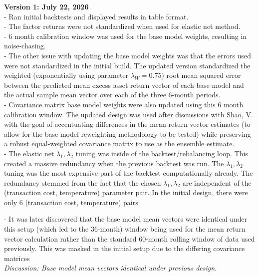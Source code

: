 \documentclass{article}
\begin{document}
\vspace{5mm}

\textbf{Version 1: July 22, 2026}\\

- Ran initial backtests and displayed results in table format.\\

- The factor returns were not standardized when used for elastic net method.\\

- 6 month calibration window was used for the base model weights, resulting in noise-chasing. \\

- The other issue with updating the base model weights was that the errors used were not standardized in the initial build. The updated version standardized the weighted (exponentially using parameter $\lambda_W = 0.75$) root mean squared error between the predicted mean excess asset return vector of each base model and the actual sample mean vector over each of the three 6-month periods.\\

- Covariance matrix base model weights were also updated using this 6 month calibration window. The updated design was used after discussions with Shao, V. with the goal of accentuating differences in the mean return vector estimates (to allow for the base model reweighting methodology to be tested) while preserving a robust equal-weighted covariance matrix to use as the ensemble estimate.\\

- The elastic net $\lambda_1, \lambda_2$ tuning was inside of the backtest/rebalancing loop. This created a massive redundancy when the previous backtest was run. The $\lambda_1, \lambda_2$ tuning was the most expensive part of the backtest computationally already. The redundancy stemmed from the fact that the chosen $\lambda_1, \lambda_2$ are independent of the (transaction cost, temperature) parameter pair. In the initial design, there were only 6 (transaction cost, temperature) pairs

- It was later discovered that the base model mean vectors were identical under this setup (which led to the 36-month) window being used for the mean return vector calculation rather than the standard 60-month rolling window of data used previously. This was masked in the initial setup due to the differing covariance matrices\\

\emph{Discussion: Base model mean vectors identical under previous design.} \\
\end{document}
